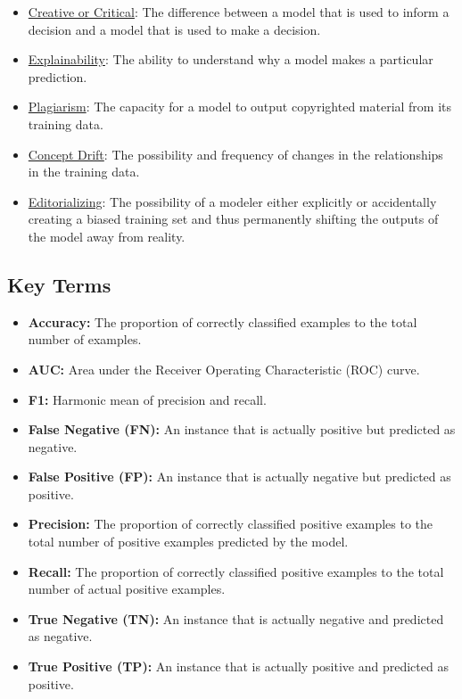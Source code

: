 \begin{itemize}
    \item \hyperref[sec:creative]{Creative or Critical}: The difference between a model that is used to inform a decision and a model that is used to make a decision.
    \item \hyperref[sec:explain]{Explainability}: The ability to understand why a model makes a particular prediction.
    \item \hyperref[sec:plag]{Plagiarism}: The capacity for a model to output copyrighted material from its training data.
    \item \hyperref[sec:drift]{Concept Drift}: The possibility and frequency of changes in the relationships in the training data.
    \item \hyperref[sec:janitor]{Editorializing}: The possibility of a modeler either explicitly or accidentally creating a biased training set and thus permanently shifting the outputs of the model away from reality.
\end{itemize}

\subsection{Key Terms}

\begin{itemize}
    \item \textbf{Accuracy:} The proportion of correctly classified examples to the total number of examples.
    \item \textbf{AUC:} Area under the Receiver Operating Characteristic (ROC) curve.
    \item \textbf{F1:} Harmonic mean of precision and recall.
    \item \textbf{False Negative (FN):} An instance that is actually positive but predicted as negative.
    \item \textbf{False Positive (FP):} An instance that is actually negative but predicted as positive.
    \item \textbf{Precision:} The proportion of correctly classified positive examples to the total number of positive examples predicted by the model.
    \item \textbf{Recall:} The proportion of correctly classified positive examples to the total number of actual positive examples.
    \item \textbf{True Negative (TN):} An instance that is actually negative and predicted as negative.
    \item \textbf{True Positive (TP):} An instance that is actually positive and predicted as positive.
\end{itemize}

